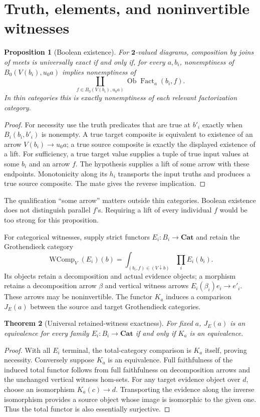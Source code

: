 \documentclass[11pt]{article}
\newtheorem{theorem}{Theorem}[section]
\newtheorem{proposition}[theorem]{Proposition}
\theoremstyle{definition}\newtheorem{definition}[theorem]{Definition}
\theoremstyle{remark}\newtheorem{remark}[theorem]{Remark}
\newcommand{\Cat}{\mathbf{Cat}}
\newcommand{\Bool}{\mathbf{2}}
\newcommand{\Fact}{\operatorname{Fact}}
\begin{document}
\section{Truth, elements, and noninvertible witnesses}
\begin{proposition}[Boolean existence]
For $\Bool$-valued diagrams, composition by joins of meets is universally
exact if and only if, for every $a,b_i$, nonemptiness of
$B_0(V(b_i),u_0a)$ implies nonemptiness of
\[
 \coprod_{f\in B_0(V(b_i),u_0a)}\operatorname{Ob}\Fact_a(b_i,f).
\]
In thin categories this is exactly nonemptiness of each relevant
factorization category.
\end{proposition}
\begin{proof}
For necessity use the truth predicates that are true at $b'_i$ exactly
when $B_i(b_i,b'_i)$ is nonempty. A true target composite is equivalent
to existence of an arrow $V(b_i)\to u_0a$; a true source composite
is exactly the displayed existence of a lift. For sufficiency, a true
target value supplies a tuple of true input values at some $b_i$ and an
arrow $f$. The hypothesis supplies a lift of some arrow with these
endpoints. Monotonicity along its $h_i$ transports the input truths and
produces a true source composite. The mate gives the reverse implication.
\end{proof}

The qualification ``some arrow'' matters outside thin categories. Boolean
existence does not distinguish parallel $f$'s. Requiring a lift of every
individual $f$ would be too strong for this proposition.

For categorical witnesses, supply strict functors $E_i:B_i\to\Cat$ and
retain the Grothendieck category
\[
 \operatorname{WComp}_V(E_i)(b)
   =\int_{(b_i,f)\in(V\downarrow b)}\prod_iE_i(b_i).
\]
Its objects retain a decomposition and actual evidence objects; a morphism
retains a decomposition arrow $\beta$ and vertical witness arrows
$E_i(\beta_i)e_i\to e'_i$. These arrows may be noninvertible. The
functor $K_a$ induces a comparison $J_E(a)$ between the source and target
Grothendieck categories.

\begin{theorem}[Universal retained-witness exactness]\label{thm:witness}
For fixed $a$, $J_E(a)$ is an equivalence for every family
$E_i:B_i\to\Cat$ if and only if $K_a$ is an equivalence.
\end{theorem}
\begin{proof}
With all $E_i$ terminal, the total-category comparison is $K_a$ itself,
proving necessity. Conversely suppose $K_a$ is an equivalence. Full
faithfulness of the induced total functor follows from full faithfulness
on decomposition arrows and the unchanged vertical witness hom-sets.
For any target evidence object over $d$, choose an isomorphism
$K_a(c)\to d$. Transporting the evidence along the inverse isomorphism
provides a source object whose image is isomorphic to the given one.
Thus the total functor is also essentially surjective.
\end{proof}
\end{document}
